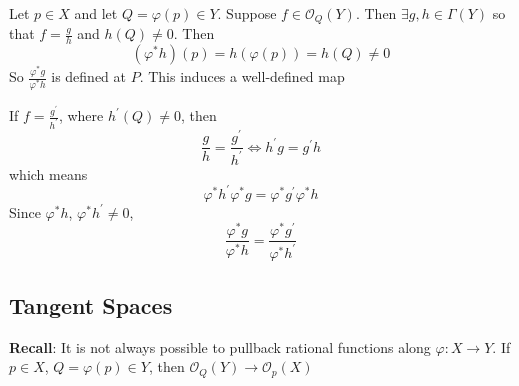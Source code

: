 \documentclass{report}
\begin{document}
Let $p \in X$ and let $Q = \varphi(p) \in Y$. Suppose $f \in \mathcal{O}_{Q}(Y)$. Then $\exists g, h \in \Gamma(Y)$ so that $f = \frac{g}{h}$ and $h(Q) \neq 0$. Then
    \begin{equation*}
        (\varphi^{*}h)(p) = h(\varphi(p)) = h(Q) \neq 0
    \end{equation*}
So $\frac{\varphi^{*}g}{\varphi^{*}h}$ is defined at $P$. This induces a well-defined map 
    \begin{center}
    \end{center}
If $f = \frac{g^{\prime}}{h^{\prime}}$, where $h^{\prime}(Q) \neq 0$, then 
    \begin{equation*}
        \dfrac{g}{h} = \dfrac{g^{\prime}}{h^{\prime}} \iff  h^{\prime}g = g^{\prime}h
    \end{equation*}
which means
    \begin{equation*}
        \varphi^{*}h^{\prime}\varphi^{*}g = \varphi^{*}g^{\prime}\varphi^{*}h
    \end{equation*}
Since $\varphi^{*}h$, $\varphi^{*}h^{\prime} \neq 0$,
    \begin{equation*}
        \dfrac{\varphi^{*}g}{\varphi^{*}h} = \dfrac{\varphi^{*}g^{\prime}}{\varphi^{*}h^{\prime}}
    \end{equation*}

\begin{topic}
    \section{Tangent Spaces}
\end{topic}

\textbf{Recall}: It is not always possible to pullback rational functions along $\varphi : X  \rightarrow Y$. If $p \in X$, $Q = \varphi(p) \in Y$, then $\mathcal{O}_{Q}(Y) \rightarrow \mathcal{O}_{p}(X)$
\end{document}

